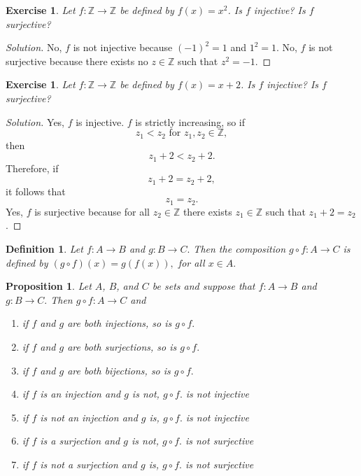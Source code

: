 \documentclass{amsart}
\newtheorem{proposition}[theorem]{Proposition}
\newtheorem{definition}[theorem]{Definition}
\newtheorem{exercise}[theorem]{Exercise}
\newcommand{\Z}{\mathbb Z}
\newcommand{\1}{\mathds{1}}
\def \Z {{\mathbb {Z}}}
\numberwithin{equation}{section}
\numberwithin{theorem}{section}
\begin{document}
\begin{exercise}
Let $f:{\mathbb Z}\rightarrow {\mathbb Z}$ be defined by $f(x)=x^2$.  Is $f$ injective?  Is $f$ surjective?

\end{exercise}

\begin{proof}[Solution]
	No, $f$ is not injective because $(-1)^2 = 1$ and $1^2=1$. No, $f$ is not surjective because there exists no $z\in\Z$ such that $z^2 = -1$.
\end{proof}

\begin{exercise}
Let $f:{\mathbb Z}\rightarrow {\mathbb Z}$ be defined by $f(x)=x+2$.  Is $f$ injective?  Is $f$ surjective?

\end{exercise}

\begin{proof}[Solution]
	Yes, $f$ is injective. $f$ is strictly increasing, so if $$z_1<z_2\text{ for } z_1,z_2\in\Z,$$ then $$z_1+2<z_2+2.$$ Therefore, if $$z_1+2=z_2+2,$$ it follows that $$z_1=z_2.$$ Yes, $f$ is surjective because for all $z_2\in\Z$ there exists $z_1\in\Z$ such that $z_1+2 = z_2$.
\end{proof}

\begin{definition}
Let $f:A\longrightarrow B$ and $g:B\longrightarrow C. $ Then the \emph{composition} $g\circ f: A\longrightarrow C$ is defined by $(g\circ f)(x)=g(f(x)),$ for all $x\in A.$ 
\end{definition}

\begin{proposition}  Let $A$, $B$, and $C$ be sets and suppose that $f:A\longrightarrow B$  and  $g:B\longrightarrow C.$  Then $g\circ f:A\longrightarrow C$ and
\begin{enumerate}
\item[a)] if $f$ and $g$ are both injections, so is $g\circ f.$

\item[b)] if $f$ and $g$ are both surjections, so is $g\circ f.$

\item[c)] if $f$ and $g$ are both bijections, so is $g\circ f.$

\item[d)] if $f$ is an injection and $g$ is not, $g\circ f.$ is not injective

\item[e)] if $f$ is not an injection and $g$ is, $g\circ f.$ is not injective

\item[f)] if $f$ is a surjection and $g$ is not, $g\circ f.$ is not surjective

\item[g)] if $f$ is not a surjection and $g$ is, $g\circ f.$ is not surjective

\end{enumerate}
\end{proposition} 
\end{document}
